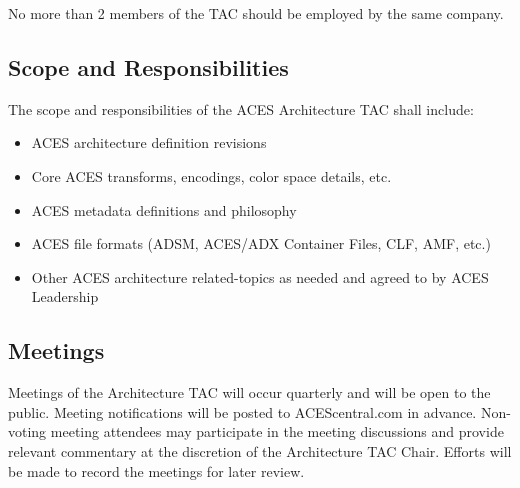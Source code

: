 No more than 2 members of the TAC should be employed by the same company.

\subsection{Scope and Responsibilities}
The scope and responsibilities of the ACES Architecture TAC shall include:

\begin{itemize}
    \item ACES architecture definition revisions
    \item Core ACES transforms, encodings, color space details, etc.
    \item ACES metadata definitions and philosophy
    \item ACES file formats (ADSM, ACES/ADX Container Files, CLF, AMF, etc.)
    \item Other ACES architecture related-topics as needed and agreed to by ACES Leadership
\end{itemize}

\subsection{Meetings}
Meetings of the Architecture TAC will occur quarterly and will be open to the public. Meeting notifications will be posted to ACEScentral.com in advance. Non-voting meeting attendees may participate in the meeting discussions and provide relevant commentary at the discretion of the Architecture TAC Chair. Efforts will be made to record the meetings for later review. 